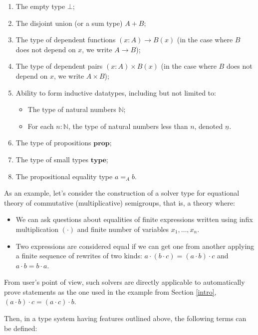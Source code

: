 \documentclass[manuscript,screen,review]{acmart}
\begin{document}
\begin{enumerate}
  \item The empty type $\bot$;
  \item The disjoint union (or a sum type) $A+B$;
  \item The type of dependent functions $(x:A)\to B(x)$ (in the case where $B$
    does not depend on $x$, we write $A\to B$);
  \item The type of dependent pairs $(x:A)\times B(x)$ (in the case where $B$
    does not depend on $x$, we write $A\times B$);
  \item Ability to form inductive datatypes, including but not limited to:
    \begin{itemize}
      \item The type of natural numbers $\mathbb{N}$;
      \item For each $n:\mathbb{N}$, the type of natural numbers less than $n$,
        denoted $\underline{n}$.
    \end{itemize}
  \item The type of propositions $\mathbf{prop}$;
  \item The type of small types $\mathbf{type}$;
  \item The propositional equality type $a=_A b$.
\end{enumerate}

As an example, let's consider the construction of a solver type for equational
theory of commutative (multiplicative) semigroups, that is, a theory where:
\begin{itemize}
  \item We can ask questions about equalities of finite expressions written
    using infix multiplication $(\cdot)$ and finite number of variables
    $x_1,\ldots,x_n$.
  \item Two expressions are considered equal if we can get one from another
    applying a finite sequence of rewrites of two kinds:
    $a\cdot(b\cdot c) = (a\cdot b)\cdot c$ and $a\cdot b=b\cdot a$.
\end{itemize}

From user's point of view, such solvers are directly applicable to automatically
prove statements as the one used in the example from Section \ref{intro},
$(a\cdot b)\cdot c = (a\cdot c)\cdot b$.

Then, in a type system having features outlined above, the following terms can
be defined:
\end{document}
